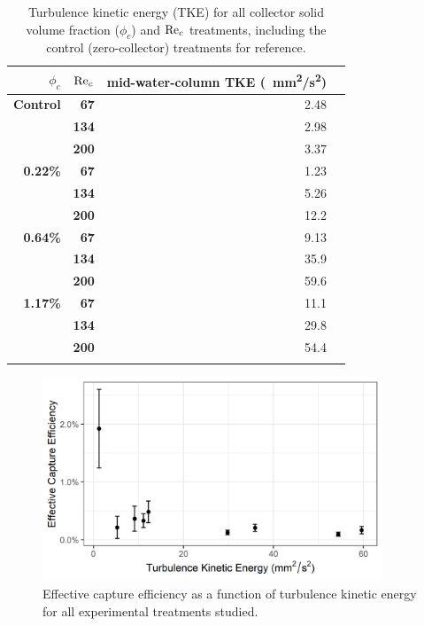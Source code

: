 \documentclass[geosciences,article,submit,moreauthors,pdftex]{Definitions/mdpi}
\begin{document}
\begin{table}[H]
\caption{Turbulence kinetic energy (TKE) for all collector solid volume fraction ($\phi_c$) and $\mathrm{Re}_c$ treatments, including the control (zero-collector) treatments for reference.}
\centering
\begin{tabular}{>{\bfseries}r>{\bfseries}rrr}
\toprule
\textbf{$\phi_c$}&\textbf{$\mathrm{Re}_c$}&\textbf{mid-water-column TKE (\SI{}{\milli\metre^2/\second^2})}\\
\midrule
Control &   67  & \num{2.48}\\
        &   134 & \num{2.98}\\
        &   200 & \num{3.37}\\
\midrule
0.22\% &   67  & \num{1.23}\\
        &   134 & \num{5.26}\\
        &   200 & \num{12.2}\\
\midrule
0.64\% &   67  & \num{9.13}\\
        &   134 & \num{35.9}\\
        &   200 & \num{59.6}\\
\midrule
1.17\%  &   67  & \num{11.1}\\
        &   134 & \num{29.8}\\
        &   200 & \num{54.4}\\
\bottomrule
\label{tbl:turbulence}
\end{tabular}
\end{table}

\begin{figure}[H]
\centering
\includegraphics[width=4in]{../pics/tke.png}
\caption{Effective capture efficiency as a function of turbulence kinetic energy for all experimental treatments studied.}
\label{fig:tke}
\end{figure}   
\end{document}
